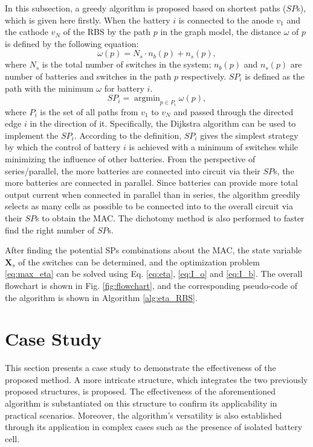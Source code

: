 \documentclass{article}
\begin{document}
In this subsection, a greedy algorithm is proposed based on shortest paths ($SP$s), which is given here firstly.
When the battery $i$ is connected to the anode $v_1$ and the cathode $v_N$ of the RBS by the path $p$ in the graph model, the distance $\omega$ of $p$ is defined by the following equation:
\begin{equation}\label{eq:weight}
    \omega(p) = N_s \cdot n_b (p) + n_s (p),
\end{equation}
where $N_s$ is the total number of switches in the system; $n_b(p)$ and $n_s(p)$ are number of batteries and switches in the path $p$ respectively.
$SP_i$ is defined as the path with the minimum $\omega$ for battery $i$.
\begin{equation}
    SP_i = \mathop{\arg\min}_{p \in P_i} \omega(p),
\end{equation}
where $P_i$ is the set of all paths from $v_1$ to $v_N$ and passed through the directed edge $i$ in the direction of it.
Specifically, the Dijkstra algorithm can be used to implement the $SP_i$.
According to the definition, $SP_i$ gives the simplest strategy by which the control of battery $i$ is achieved with a minimum of switches while minimizing the influence of other batteries.
From the perspective of series/parallel, the more batteries are connected into circuit via their $SP$s, the more batteries are connected in parallel.
Since batteries can provide more total output current when connected in parallel than in series, the algorithm greedily selects as many cells as possible to be connected into to the overall circuit via their $SP$s to obtain the MAC.
The dichotomy method is also performed to faster find the right number of $SP$s.

After finding the potential SPs combinations about the MAC, the state variable $\bm{X}_s$ of the switches can be determined, and the optimization problem \ref{eq:max_eta} can be solved using Eq. \ref{eq:eta}, \ref{eq:I_o} and \ref{eq:I_b}.
The overall flowchart is shown in Fig. \ref{fig:flowchart}, and the corresponding pseudo-code of the algorithm is shown in Algorithm \ref{alg:eta_RBS}.

\section{Case Study}

This section presents a case study to demonstrate the effectiveness of the proposed method.
A more intricate structure, which integrates the two previously proposed structures, is proposed.
The effectiveness of the aforementioned algorithm is substantiated on this structure to confirm its applicability in practical scenarios.
Moreover, the algorithm's versatility is also established through its application in complex cases such as the presence of isolated battery cell.
\end{document}
